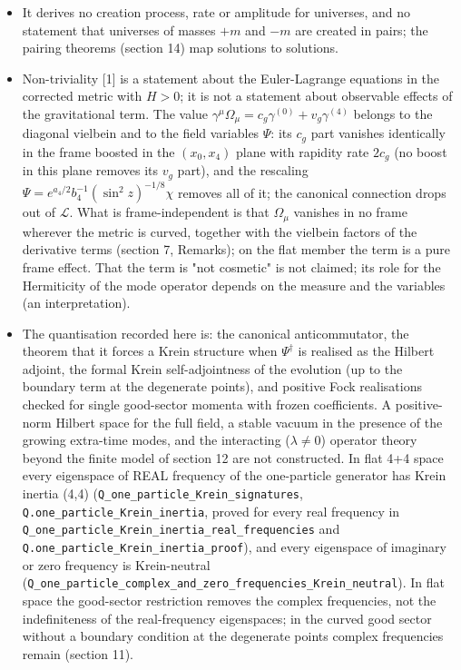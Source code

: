 \documentclass[11pt]{article}
\begin{document}
\begin{itemize}
\item It derives no creation process, rate or amplitude for universes, and no statement that universes of masses $+m$ and $-m$ are created in pairs; the pairing theorems (section 14) map solutions to solutions.
\item Non-triviality [1] is a statement about the Euler-Lagrange equations in the corrected metric with $H > 0$; it is not a statement about observable effects of the gravitational term. The value $\gamma^\mu\Omega_\mu = c_g\gamma^{(0)} + v_g\gamma^{(4)}$ belongs to the diagonal vielbein and to the field variables $\Psi$: its $c_g$ part vanishes identically in the frame boosted in the $(x_0, x_4)$ plane with rapidity rate $2c_g$ (no boost in this plane removes its $v_g$ part), and the rescaling $\Psi = e^{a_4/2}b_4^{-1}(\sin^2 z)^{-1/8}\chi$ removes all of it; the canonical connection drops out of $\mathcal{L}$. What is frame-independent is that $\Omega_\mu$ vanishes in no frame wherever the metric is curved, together with the vielbein factors of the derivative terms (section 7, Remarks); on the flat member the term is a pure frame effect. That the term is "not cosmetic" is not claimed; its role for the Hermiticity of the mode operator depends on the measure and the variables (an interpretation).
\item The quantisation recorded here is: the canonical anticommutator, the theorem that it forces a Krein structure when $\Psi^\dagger$ is realised as the Hilbert adjoint, the formal Krein self-adjointness of the evolution (up to the boundary term at the degenerate points), and positive Fock realisations checked for single good-sector momenta with frozen coefficients. A positive-norm Hilbert space for the full field, a stable vacuum in the presence of the growing extra-time modes, and the interacting ($\lambda \neq 0$) operator theory beyond the finite model of section 12 are not constructed. In flat 4+4 space every eigenspace of REAL frequency of the one-particle generator has Krein inertia (4,4) (\texttt{Q\_one\_pa\allowbreak{}rticle\_K\allowbreak{}rein\_sig\allowbreak{}natures}, \texttt{Q.one\_pa\allowbreak{}rticle\_K\allowbreak{}rein\_ine\allowbreak{}rtia}, proved for every real frequency in \texttt{Q\_one\_pa\allowbreak{}rticle\_K\allowbreak{}rein\_ine\allowbreak{}rtia\_rea\allowbreak{}l\_freque\allowbreak{}ncies} and \texttt{Q.one\_pa\allowbreak{}rticle\_K\allowbreak{}rein\_ine\allowbreak{}rtia\_pro\allowbreak{}of}), and every eigenspace of imaginary or zero frequency is Krein-neutral (\texttt{Q\_one\_pa\allowbreak{}rticle\_c\allowbreak{}omplex\_a\allowbreak{}nd\_zero\_\allowbreak{}frequenc\allowbreak{}ies\_Krei\allowbreak{}n\_neutra\allowbreak{}l}). In flat space the good-sector restriction removes the complex frequencies, not the indefiniteness of the real-frequency eigenspaces; in the curved good sector without a boundary condition at the degenerate points complex frequencies remain (section 11).

\end{itemize}
\end{document}
